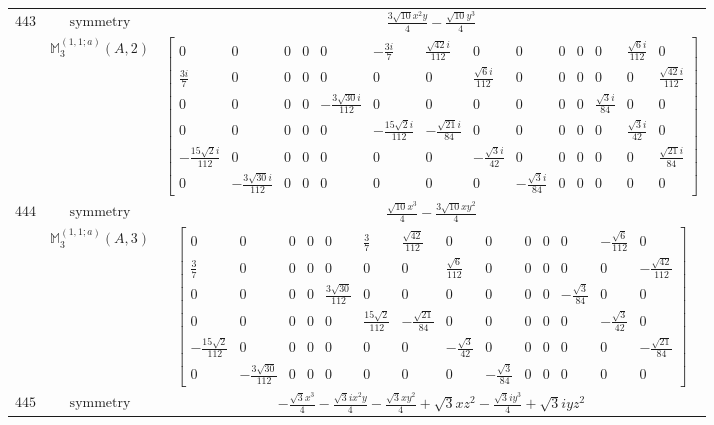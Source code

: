 \documentclass[fleqn,8pt,landscape]{jsarticle}
\begin{document}
\begin{longtable}{ccc}
$ 443 $ & $ \text{symmetry} $ & $ \frac{3 \sqrt{10} x^{2} y}{4} - \frac{\sqrt{10} y^{3}}{4} $ \\
$  $ & $ \mathbb{M}_{3}^{(1,1;a)}(A,2) $ & $ \begin{bmatrix} 0 & 0 & 0 & 0 & 0 & - \frac{3 i}{7} & \frac{\sqrt{42} i}{112} & 0 & 0 & 0 & 0 & 0 & \frac{\sqrt{6} i}{112} & 0 \\ \frac{3 i}{7} & 0 & 0 & 0 & 0 & 0 & 0 & \frac{\sqrt{6} i}{112} & 0 & 0 & 0 & 0 & 0 & \frac{\sqrt{42} i}{112} \\ 0 & 0 & 0 & 0 & - \frac{3 \sqrt{30} i}{112} & 0 & 0 & 0 & 0 & 0 & 0 & \frac{\sqrt{3} i}{84} & 0 & 0 \\ 0 & 0 & 0 & 0 & 0 & - \frac{15 \sqrt{2} i}{112} & - \frac{\sqrt{21} i}{84} & 0 & 0 & 0 & 0 & 0 & \frac{\sqrt{3} i}{42} & 0 \\ - \frac{15 \sqrt{2} i}{112} & 0 & 0 & 0 & 0 & 0 & 0 & - \frac{\sqrt{3} i}{42} & 0 & 0 & 0 & 0 & 0 & \frac{\sqrt{21} i}{84} \\ 0 & - \frac{3 \sqrt{30} i}{112} & 0 & 0 & 0 & 0 & 0 & 0 & - \frac{\sqrt{3} i}{84} & 0 & 0 & 0 & 0 & 0 \end{bmatrix} $ \\ \hline
$ 444 $ & $ \text{symmetry} $ & $ \frac{\sqrt{10} x^{3}}{4} - \frac{3 \sqrt{10} x y^{2}}{4} $ \\
$  $ & $ \mathbb{M}_{3}^{(1,1;a)}(A,3) $ & $ \begin{bmatrix} 0 & 0 & 0 & 0 & 0 & \frac{3}{7} & \frac{\sqrt{42}}{112} & 0 & 0 & 0 & 0 & 0 & - \frac{\sqrt{6}}{112} & 0 \\ \frac{3}{7} & 0 & 0 & 0 & 0 & 0 & 0 & \frac{\sqrt{6}}{112} & 0 & 0 & 0 & 0 & 0 & - \frac{\sqrt{42}}{112} \\ 0 & 0 & 0 & 0 & \frac{3 \sqrt{30}}{112} & 0 & 0 & 0 & 0 & 0 & 0 & - \frac{\sqrt{3}}{84} & 0 & 0 \\ 0 & 0 & 0 & 0 & 0 & \frac{15 \sqrt{2}}{112} & - \frac{\sqrt{21}}{84} & 0 & 0 & 0 & 0 & 0 & - \frac{\sqrt{3}}{42} & 0 \\ - \frac{15 \sqrt{2}}{112} & 0 & 0 & 0 & 0 & 0 & 0 & - \frac{\sqrt{3}}{42} & 0 & 0 & 0 & 0 & 0 & - \frac{\sqrt{21}}{84} \\ 0 & - \frac{3 \sqrt{30}}{112} & 0 & 0 & 0 & 0 & 0 & 0 & - \frac{\sqrt{3}}{84} & 0 & 0 & 0 & 0 & 0 \end{bmatrix} $ \\ \hline
$ 445 $ & $ \text{symmetry} $ & $ - \frac{\sqrt{3} x^{3}}{4} - \frac{\sqrt{3} i x^{2} y}{4} - \frac{\sqrt{3} x y^{2}}{4} + \sqrt{3} x z^{2} - \frac{\sqrt{3} i y^{3}}{4} + \sqrt{3} i y z^{2} $ \\

\end{longtable}
\end{document}

